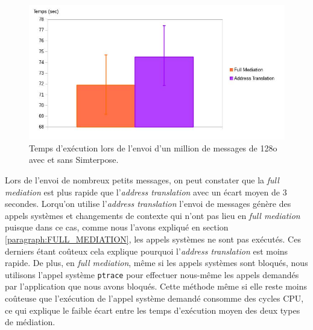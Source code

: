 \begin{figure}[H]
  \centering
    \includegraphics[scale=0.5]{mesures/graph/Littlemsg.jpg}
    \caption[Temps d'exécution de l'envoi d'un million de messages de 128o]{Temps d'exécution lors de l'envoi d'un million de messages de 128o avec et sans Simterpose.}
    \label{Network_Little_Mediation}
\end{figure}

Lors de l'envoi de nombreux petits messages, on peut constater que la \textit{full mediation} est plus rapide que l'\textit{address translation} avec un écart moyen de 3 secondes. Lorqu'on utilise l'\textit{address translation} l'envoi de messages génère des appels systèmes et changements de contexte qui n'ont pas lieu en \textit{full mediation} puisque dans ce cas, comme nous l'avons expliqué en section \ref{paragraph:FULL_MEDIATION}, les appels systèmes ne sont pas exécutés. Ces derniers étant coûteux cela explique pourquoi l'\textit{address translation} est moins rapide. De plus, en \textit{full mediation}, même si les appels systèmes sont bloqués, nous utilisons l'appel système \texttt{ptrace} pour effectuer nous-même les appels demandés par l'application que nous avons bloqués. Cette méthode même si elle reste moins coûteuse que l'exécution de l'appel système demandé consomme des cycles CPU, ce qui explique le faible écart entre les temps d'exécution moyen des deux types de médiation.

